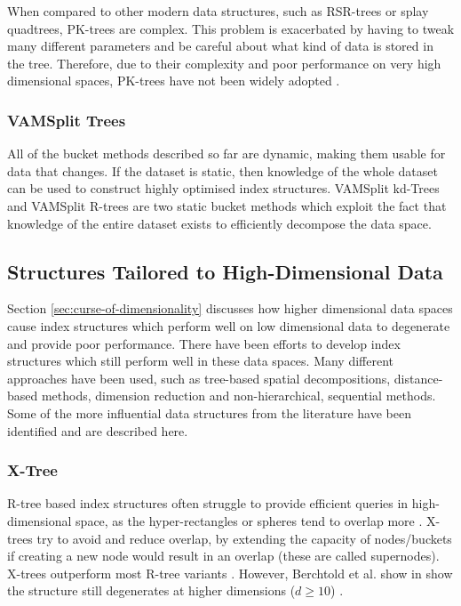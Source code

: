 When compared to other modern data structures, such as RSR-trees or splay quadtrees, PK-trees are complex. This problem is exacerbated by having to tweak many different parameters and be careful about what kind of data is stored in the tree. Therefore, due to their complexity and poor performance on very high dimensional spaces, PK-trees have not been widely adopted \cite{md-structures-samet}.

\subsubsection{VAMSplit Trees}

All of the bucket methods described so far are dynamic, making them usable for data that changes. If the dataset is static, then knowledge of the whole dataset can be used to construct highly optimised index structures. VAMSplit kd-Trees and VAMSplit R-trees \cite{md-structures-samet} are two static bucket methods which exploit the fact that knowledge of the entire dataset exists to efficiently decompose the data space.

\subsection{Structures Tailored to High-Dimensional Data}

Section \ref{sec:curse-of-dimensionality} discusses how higher dimensional data spaces cause index structures which perform well on low dimensional data to degenerate and provide poor performance. There have been efforts to develop index structures which still perform well in these data spaces. Many different approaches have been used, such as tree-based spatial decompositions, distance-based methods, dimension reduction and non-hierarchical, sequential methods. Some of the more influential data structures from the literature have been identified and are described here.

\subsubsection{X-Tree}

R-tree based index structures often struggle to provide efficient queries in high-dimensional space, as the hyper-rectangles or spheres tend to overlap more \cite{pyramid-tree}. X-trees \cite{x-tree} try to avoid and reduce overlap, by extending the capacity of nodes/buckets if creating a new node would result in an overlap (these are called supernodes). X-trees outperform most R-tree variants \cite{x-tree}. However, Berchtold et al. show in  \cite{pyramid-tree} show the structure still degenerates at higher dimensions ($d \geq 10$) \cite{pyramid-tree}.

